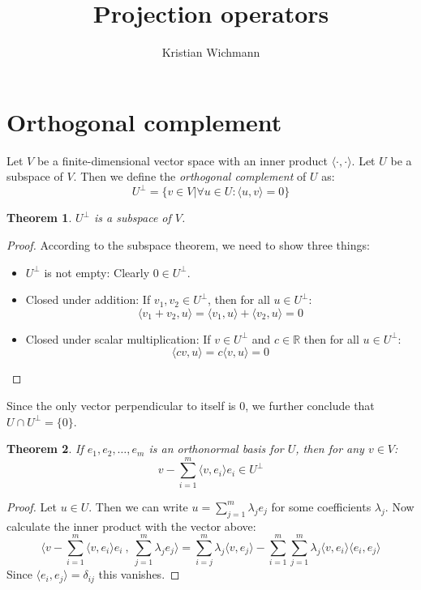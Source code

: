 \documentclass[12pt, a4paper]{article}
\title{Projection operators}
\author{Kristian Wichmann}
\newtheorem{theorem}{Theorem}[section]
\numberwithin{equation}{section}
\begin{document}
\maketitle

\section{Orthogonal complement}
Let $V$ be a finite-dimensional vector space with an inner product $\langle\cdot,\cdot\rangle$. Let $U$ be a subspace of $V$. Then we define the \textit{orthogonal complement} of $U$ as:
\begin{equation}
U^\perp=\{v\in V|\forall u\in U: \langle u, v\rangle = 0\}
\end{equation}
\begin{theorem}
$U^\perp$ is a subspace of $V$.
\end{theorem}
\begin{proof}
According to the subspace theorem, we need to show three things:
\begin{itemize}
\item $U^\perp$ is not empty: Clearly $0\in U^\perp$.
\item Closed under addition: If $v_1,v_2\in U^\perp$, then for all $u\in U^\perp$:
\begin{equation}
\langle v_1+v_2,u\rangle=\langle v_1,u\rangle + \langle v_2,u\rangle = 0 
\end{equation}
\item Closed under scalar multiplication: If $v\in U^\perp$ and $c\in\mathbb{R}$ then for all $u\in U^\perp$:
\begin{equation}
\langle cv,u\rangle = c\langle v,u\rangle = 0
\end{equation}
\end{itemize}
\end{proof}

Since the only vector perpendicular to itself is $0$, we further conclude that $U\cap U^\perp=\{0\}$.

\begin{theorem}
If $e_1, e_2,\ldots,e_m$ is an orthonormal basis for $U$, then for any $v\in V$:
\begin{equation}
v-\sum_{i=1}^m\langle v,e_i\rangle e_i\in U^\perp
\end{equation}
\end{theorem}
\begin{proof}
Let $u\in U$. Then we can write $u=\sum_{j=1}^m\lambda_j e_j$ for some coefficients $\lambda_j$. Now calculate the inner product with the vector above:
\begin{equation}
\langle v-\sum_{i=1}^m\langle v,e_i\rangle e_i\ ,\ \sum_{j=1}^m\lambda_j e_j\rangle=\sum_{i=j}^m\lambda_j\langle v,e_j\rangle-\sum_{i=1}^m\sum_{j=1}^m\lambda_j\langle v,e_i\rangle\langle e_i,e_j\rangle
\end{equation}
Since $\langle e_i,e_j\rangle=\delta_{ij}$ this vanishes.
\end{proof}
\end{document}
